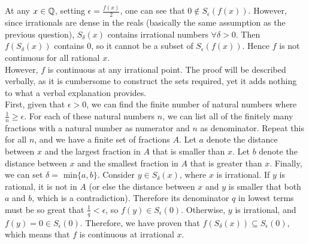 \begin{solution}
 At any $x \in \mathbb{Q}$, setting $\epsilon = \frac{f(x)}{2}$, one can see that $0 \notin S_\epsilon(f(x))$. However, since irrationals are dense in the reals (basically the same assumption as the previous question), $S_\delta(x)$ contains irrational numbers $\forall \delta > 0$. Then $f(S_\delta(x))$ contains $0$, so it cannot be a subset of $S_\epsilon(f(x))$. Hence $f$ is not continuous for all rational $x$. \\
 However, $f$ is continuous at any irrational point. The proof will be described verbally, as it is cumbersome to construct the sets required, yet it adds nothing to what a verbal explanation provides. \\
 First, given that $\epsilon > 0$, we can find the finite number of natural numbers where $\frac{1}{n} \geq \epsilon$. For each of these natural numbers $n$, we can list all of the finitely many fractions with a natural number as numerator and $n$ as denominator. Repeat this for all $n$, and we have a finite set of fractions $A$. Let $a$ denote the distance between $x$ and the largest fraction in $A$ that is smaller than $x$. Let $b$ denote the distance between $x$ and the smallest fraction in $A$ that is greater than $x$. Finally, we can set $\delta =$ min$\{a,b\}$. Consider $y \in S_\delta(x)$, where $x$ is irrational. If $y$ is rational, it is not in $A$ (or else the distance between $x$ and $y$ is smaller that both $a$ and $b$, which is a contradiction). Therefore its denominator $q$ in lowest terms must be so great that $\frac{1}{q} < \epsilon$, so $f(y) \in S_\epsilon(0)$. Otherwise, $y$ is irrational, and $f(y) = 0 \in S_\epsilon(0)$. Therefore, we have proven that $f(S_\delta(x)) \subseteq S_\epsilon(0)$, which means that $f$ is continuous at irrational $x$.
\end{solution}


